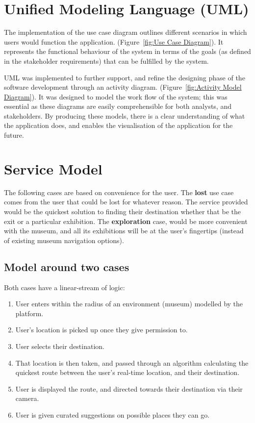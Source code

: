 
{
\section{Unified Modeling Language (UML)}
The implementation of the use case diagram outlines different scenarios in which users would function the application. (Figure~\ref{fig:Use Case Diagram}). It represents the functional behaviour of the system in terms of the goals (as defined in the stakeholder requirements) that can be fulfilled by the system.

UML was implemented to further support, and refine the designing phase of the software development through an activity diagram. (Figure~\ref{fig:Activity Model Diagram}). It was designed to model the work flow of the system; this was essential as these diagrams are easily comprehensible for both analysts, and stakeholders. By producing these models, there is a clear understanding of what the application does, and enables the visualisation of the application for the future.

\section{Service Model}
The following cases are based on convenience for the user. The \textbf{lost} use case comes from the user that could be lost for whatever reason. The service provided would be the quickest solution to finding their destination whether that be the exit or a particular exhibition. The \textbf{exploration} case, would be more convenient with the museum, and all its exhibitions will be at the user's fingertips (instead of existing museum navigation options).

\subsection*{Model around two cases}
Both cases have a linear-stream of logic:

\begin{enumerate}
    \item User enters within the radius of an environment (museum) modelled by the platform.
    \item User’s location is picked up once they give permission to.
    \item User selects their destination.
    \item That location is then taken, and passed through an algorithm calculating the quickest route between the user’s real-time location, and their destination.
    \item User is displayed the route, and directed towards their destination via their camera.
    \item User is given curated suggestions on possible places they can go.
\end{enumerate}

}